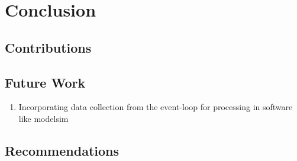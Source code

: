 \chapter{Conclusion}
\label{ch:conclusion}


\section{Contributions}
\label{sec:contributions}

\section{Future Work}
\label{sec:future-work}

\begin{enumerate}
    \item Incorporating data collection from the event-loop for processing in software like modelsim
\end{enumerate}

\section{Recommendations}
